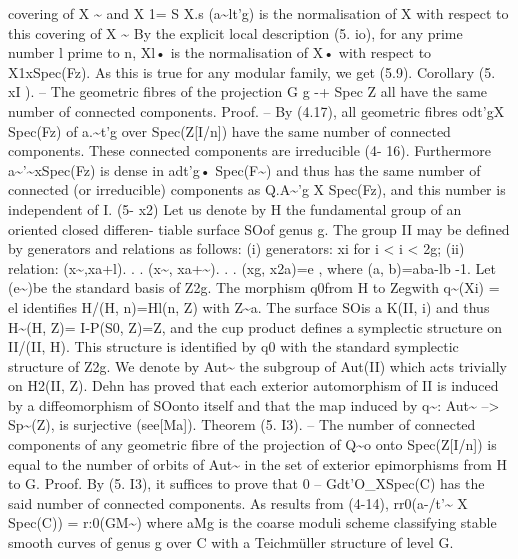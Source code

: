 \documentclass[11pt]{article}
\theoremstyle{plain}
\theoremstyle{definition}
\theoremstyle{remark}
\begin{document}
covering of X \textasciitilde{} and X 1= S X.s (a\textasciitilde{}lt'g) is the normalisation of X with respect to this covering of X \textasciitilde{} By the explicit local description (5. io), for any prime number l prime to n, Xl• is the normalisation of X• with respect to X1xSpec(Fz). As this is true for any modular family, we get (5.9). Corollary (5. xI ). -- The geometric fibres of the projection G g -+ Spec Z all have the same number of connected components. Proof. -- By (4.17), all geometric fibres odt'gX Spec(Fz) of a.\textasciitilde{}t'g over Spec(Z[I/n]) have the same number of connected components. These connected components are irreducible (4- 16). Furthermore a\textasciitilde{}'\textasciitilde{}xSpec(Fz) is dense in adt'g• Spec(F\textasciitilde{}) and thus has the same number of connected (or irreducible) components as Q.A\textasciitilde{}'g X Spec(Fz), and this number is independent of I. (5- x2) Let us denote by H the fundamental group of an oriented closed differen- tiable surface SOof genus g. The group II may be defined by generators and relations as follows: (i) generators: xi for i < i < 2g; (ii) relation: (x\textasciitilde{},xa+l). . . (x\textasciitilde{}, xa+\textasciitilde{}). . . (xg, x2a)=e , where (a, b)=aba-lb -1. Let (e\textasciitilde{})be the standard basis of Z2g. The morphism q0from H to Zegwith q\textasciitilde{}(Xi) = el identifies H/(H, n)=Hl(n, Z) with Z\textasciitilde{}a. The surface SOis a K(II, i) and thus H\textasciitilde{}(H, Z)= I-P(S0, Z)=Z, and the cup product defines a symplectic structure on II/(II, H). This structure is identified by q0 with the standard symplectic structure of Z2g. We denote by Aut\textasciitilde{} the subgroup of Aut(II) which acts trivially on H2(II, Z). Dehn has proved that each exterior automorphism of II is induced by a diffeomorphism of SOonto itself and that the map induced by q\textasciitilde{}: Aut\textasciitilde{} --> Sp\textasciitilde{}(Z), is surjective (see[Ma]). Theorem (5. I3). -- The number of connected components of any geometric fibre of the projection of Q\textasciitilde{}o onto Spec(Z[I/n]) is equal to the number of orbits of Aut\textasciitilde{} in the set of exterior epimorphisms from H to G. Proof. By (5. I3), it suffices to prove that 0 -- Gdt'O\_XSpec(C) has the said number of connected components. As results from (4-14), rr0(a-/t'\textasciitilde{} X Spec(C)) = r:0(GM\textasciitilde{}) where aMg is the coarse moduli scheme classifying stable smooth curves of genus g over C with a Teichmüller structure of level G.
\end{document}
